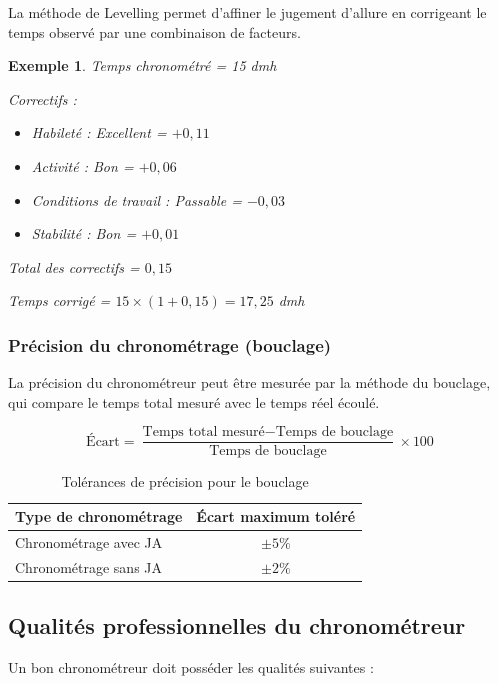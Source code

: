 \documentclass[a4paper,12pt]{article}
\newtheorem{exemple}{Exemple}[section]
\begin{document}
La méthode de Levelling permet d'affiner le jugement d'allure en corrigeant le temps observé par une combinaison de facteurs.

\begin{exemple}
Temps chronométré = 15 dmh

Correctifs :
\begin{itemize}
    \item Habileté : Excellent = $+0,11$
    \item Activité : Bon = $+0,06$
    \item Conditions de travail : Passable = $-0,03$
    \item Stabilité : Bon = $+0,01$
\end{itemize}

Total des correctifs = $0,15$

Temps corrigé = $15 \times (1 + 0,15) = 17,25$ dmh
\end{exemple}

\subsubsection{Précision du chronométrage (bouclage)}

La précision du chronométreur peut être mesurée par la méthode du bouclage, qui compare le temps total mesuré avec le temps réel écoulé.

\[
\text{Écart} = \frac{\text{Temps total mesuré} - \text{Temps de bouclage}}{\text{Temps de bouclage}} \times 100
\]

\begin{table}[ht]
\centering
\begin{tabular}{|l|c|}
\hline
\textbf{Type de chronométrage} & \textbf{Écart maximum toléré} \\
\hline
Chronométrage avec JA & $\pm 5\%$ \\
Chronométrage sans JA & $\pm 2\%$ \\
\hline
\end{tabular}
\caption{Tolérances de précision pour le bouclage}
\end{table}

\subsection{Qualités professionnelles du chronométreur}

Un bon chronométreur doit posséder les qualités suivantes :
\end{document}
